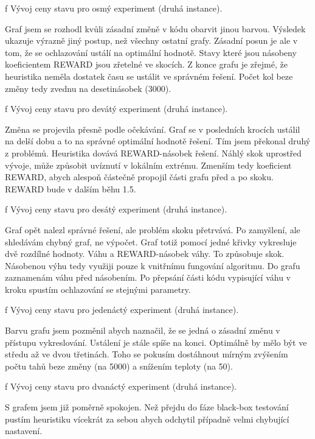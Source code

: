 \centerline{ \picwidth=15cm  }
\caption/f Vývoj ceny stavu pro osmý experiment (druhá instance).
\bigskip

Graf jsem se rozhodl kvůli zásadní změně v kódu obarvit jinou barvou. Výsledek ukazuje výrazně jiný postup, než všechny ostatní grafy. Zásadní posun je ale v tom, že se ochlazování ustálí na optimální hodnotě. Stavy které jsou násobeny koeficientem REWARD jsou zřetelné ve skocích. Z konce grafu je zřejmé, že heuristika neměla dostatek času se ustálit ve správném řešení. Počet kol beze změny tedy zvednu na desetinásobek (3000).

\centerline{ \picwidth=15cm  }
\caption/f Vývoj ceny stavu pro devátý experiment (druhá instance).
\bigskip

Změna se projevila přesně podle očekávání. Graf se v posledních krocích ustálil na delší dobu a to na správné optimální hodnotě řešení. Tím jsem překonal druhý z problémů. Heuristika dovává REWARD-násobek řešení. Náhlý skok uprostřed vývoje, může způsobit uvíznutí v lokálním extrému. Zmenším tedy koeficient REWARD, abych alespoň částečně propojil části grafu před a po skoku. REWARD bude v dalším běhu 1.5.

\centerline{ \picwidth=15cm  }
\caption/f Vývoj ceny stavu pro desátý experiment (druhá instance).
\bigskip

Graf opět nalezl správné řešení, ale problém skoku přetrvává. Po zamyšlení, ale shledávám chybný graf, ne výpočet. Graf totiž pomocí jedné křivky vykresluje dvě rozdílné hodnoty. Váhu a REWARD-násobek váhy. To způsobuje skok. Násobenou výhu tedy využiji pouze k vnitřnímu fungování algoritmu. Do grafu zaznamenám váhu před násobením. Po přepsání části kódu vypisující váhu v kroku spustím ochlazování se stejnými parametry.

\centerline{ \picwidth=15cm  }
\caption/f Vývoj ceny stavu pro jedenáctý experiment (druhá instance).
\bigskip

Barvu grafu jsem pozměnil abych naznačil, že se jedná o zásadní změnu v přístupu vykreslování. Ustálení je stále spíše na konci. Optimálně by mělo být ve středu až ve dvou třetinách. Toho se pokusím dostáhnout mírným zvýšením počtu tahů beze změny (na 5000) a snížením teploty (na 50).

\centerline{ \picwidth=15cm  }
\caption/f Vývoj ceny stavu pro dvanáctý experiment (druhá instance).
\bigskip

S grafem jsem již poměrně spokojen. Než přejdu do fáze black-box testování pustím heuristiku vícekrát za sebou abych odchytil případně velmi chybující nastavení.


